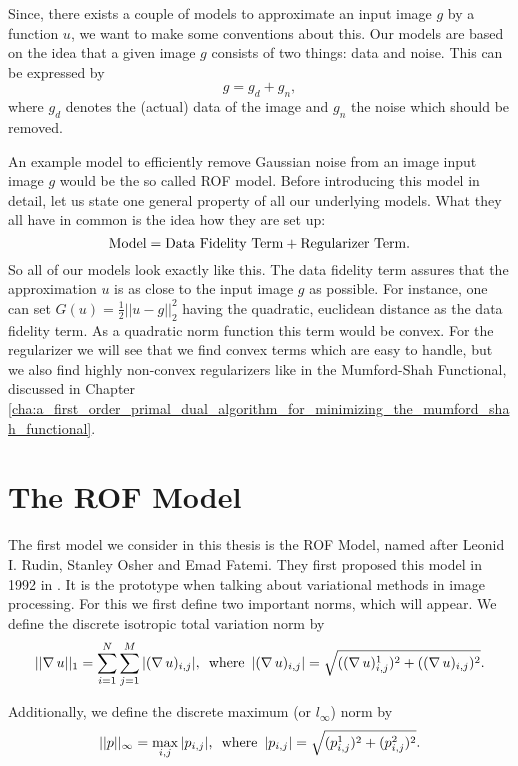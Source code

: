 Since, there exists a couple of models to approximate an input image $g$ by a function $u$, we want to make some conventions about this. Our models are based on the idea that a given image $g$ consists of two things: data and noise. This can be expressed by
    $$
        g = g_{d} + g_{n},
    $$
where $g_{d}$ denotes the (actual) data of the image and $g_{n}$ the noise which should be removed.

An example model to efficiently remove Gaussian noise from an image input image $g$ would be the so called ROF model. Before introducing this model in detail, let us state one general property of all our underlying models. What they all have in common is the idea how they are set up:
    $$
        \textnormal{Model} = \textnormal{Data Fidelity Term} + \textnormal{Regularizer Term}.
    $$
So all of our models look exactly like this. The data fidelity term assures that the approximation $u$ is as close to the input image $g$ as possible. For instance, one can set $G(u) = \frac{1}{2} ||u - g||_{2}^{2}$ having the quadratic, euclidean distance as the data fidelity term. As a quadratic norm function this term would be convex. For the regularizer we will see that we find convex terms which are easy to handle, but we also find highly non-convex regularizers like in the Mumford-Shah Functional, discussed in Chapter \ref{cha:a_first_order_primal_dual_algorithm_for_minimizing_the_mumford_shah_functional}.

\section{The ROF Model} %
\label{sec:the_rof_model}
    
    The first model we consider in this thesis is the ROF Model, named after Leonid I. Rudin, Stanley Osher and Emad Fatemi. They first proposed this model in 1992 in \cite{ROF}. It is the prototype when talking about variational methods in image processing. For this we first define two important norms, which will appear. We define the discrete isotropic total variation norm by
        \begin{equation}
            ||\nabla \, u||_{1} = \sum_{i = 1}^{N} \sum_{j = 1}^{M} |(\nabla \, u)_{i, j}|, \,\,\, \textnormal{where} \,\,\, |(\nabla \, u)_{i, j}| = \sqrt{((\nabla \, u)^{1}_{i, j})^{2} + ((\nabla \, u)_{i, j})^{2}}.
        \label{eq:isotropic_total_variation_norm}
        \end{equation}

    Additionally, we define the discrete maximum (or $l_{\infty}$) norm by
        \begin{equation}
            ||p||_{\infty} = \max_{i, j} |p_{i, j}|, \,\,\, \textnormal{where} \,\,\, |p_{i, j}| = \sqrt{(p^{1}_{i, j})^{2} + (p^{2}_{i, j})^{2}}.
        \end{equation}

